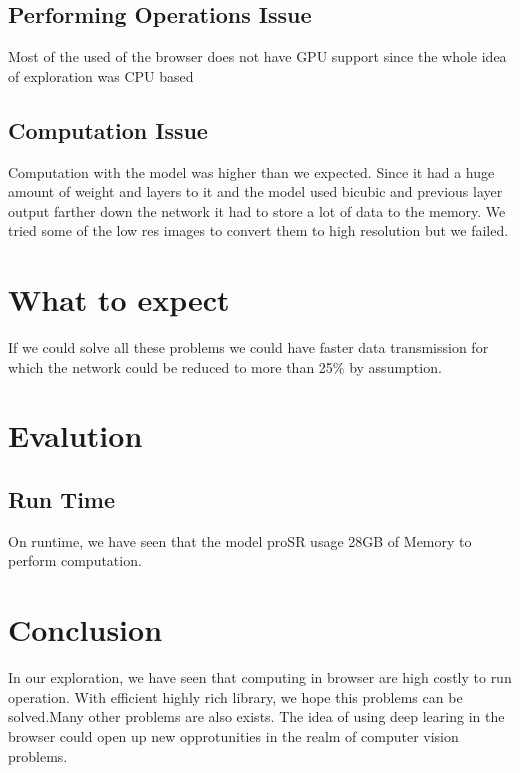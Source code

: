 \documentclass[a4paper,12pt]{article}
\begin{document}
\subsection{Performing Operations Issue }
Most of the used of the browser does not have GPU support since the whole idea of exploration was CPU based

\subsection{Computation Issue}
Computation with the model was higher than we expected. Since it had a huge amount of weight and layers to it and the model used bicubic and previous layer output farther down the network it had to store a lot of data to the memory. We tried some of the low res images to convert them to high resolution but we failed. 


\section{What to expect}
If we could solve all these problems we could have faster data transmission for which the network could be reduced to more than 25\% by assumption.

\section{Evalution}
\subsection{Run Time}
On runtime, we have seen that the model proSR usage 28GB of Memory to perform computation.

\section{Conclusion}
 In our exploration, we have seen that computing in browser are high costly to run operation. With efficient highly rich library, we hope this problems can be solved.Many other problems are also exists. The idea of using deep learing in the browser could open up new opprotunities in the realm of computer vision problems. 




\end{document}

